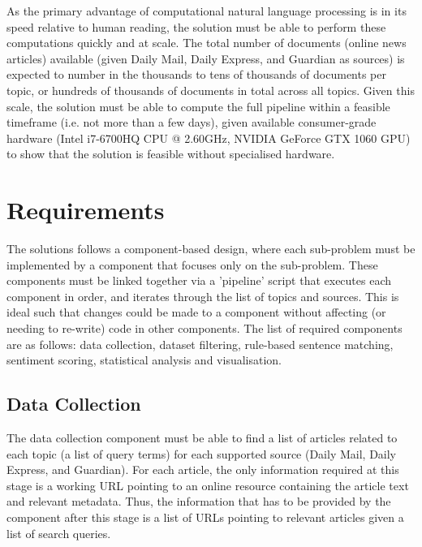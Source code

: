 \documentclass{report}
\begin{document}
As the primary advantage of computational natural language processing is in its speed relative to human reading, the solution must be able to perform these computations quickly and at scale.
The total number of documents (online news articles) available (given Daily Mail, Daily Express, and Guardian as sources) is expected to number in the thousands to tens of thousands of documents per topic, or hundreds of thousands of documents in total across all topics.
Given this scale, the solution must be able to compute the full pipeline within a feasible timeframe (i.e. not more than a few days), given available consumer-grade hardware (Intel i7-6700HQ CPU @ 2.60GHz, NVIDIA GeForce GTX 1060 GPU) to show that the solution is feasible without specialised hardware.

\section{Requirements} \label{Requirements}

The solutions follows a component-based design, where each sub-problem must be implemented by a component that focuses only on the sub-problem.
These components must be linked together via a 'pipeline' script that executes each component in order, and iterates through the list of topics and sources.
This is ideal such that changes could be made to a component without affecting (or needing to re-write) code in other components.
The list of required components are as follows: data collection, dataset filtering, rule-based sentence matching, sentiment scoring, statistical analysis and visualisation.


\subsection{Data Collection} \label{req-data-collection}  %

The data collection component must be able to find a list of articles related to each topic (a list of query terms) for each supported source (Daily Mail, Daily Express, and Guardian).
For each article, the only information required at this stage is a working URL pointing to an online resource containing the article text and relevant metadata.
Thus, the information that has to be provided by the component after this stage is a list of URLs pointing to relevant articles given a list of search queries.
\end{document}
